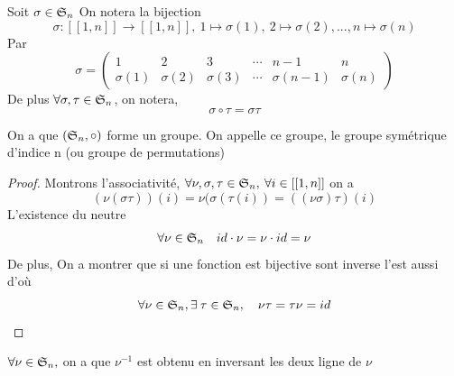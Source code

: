 Soit $\sigma \in \mathfrak{S}_n$ On notera la bijection \[\sigma:[[1,n]]\to [[1,n]], \: 1\mapsto \sigma(1), \: 2\mapsto \sigma(2), ..., n\mapsto \sigma(n)\]
    Par 
   \[
  \sigma = \begin{pmatrix}
      
 
    1 & 2 & 3 & \cdots & n-1 & n \\
    \sigma(1) & \sigma(2) & \sigma(3) & \cdots &  \sigma(n-1)  & \sigma(n)
  \end{pmatrix}
\]
De plus $\forall \sigma, \tau \in \mathfrak{S}_n$, on notera,\\
\[
\sigma\circ\tau = \sigma \tau
\]
\begin{proposition}
        On a que $(\mathfrak{S}_n, \circ)$ forme un groupe. On appelle ce groupe, le groupe symétrique d'indice n (ou groupe de permutations)
    \end{proposition}

\begin{proof}
    Montrons l'associativité,
    $\forall\nu,\sigma ,\tau \in \mathfrak{S}_n, \: \forall i\in [[1,n]]$ on a 
    \[
    (\nu(\sigma \tau))(i)=\nu(\sigma(\tau(i))=((\nu\sigma)\tau)(i)
    \]
    L'existence du neutre
    \[
    \forall \nu \in \mathfrak{S}_n \quad id\cdot\nu =\nu \cdot id = \nu 
    \]
    De plus, On a montrer que si une fonction est bijective sont inverse l'est aussi d'où
    \[
    \forall \nu \in \mathfrak{S} _n, \exists\: \tau \in \mathfrak{S} _n, \quad \nu \tau =\tau \nu = id  
    \]
\end{proof}

\begin{remarque}
    $\forall \nu \in \mathfrak{S}_n,$ on a que $\nu^{-1}$ est obtenu en inversant les deux ligne de $\nu$
\end{remarque}

